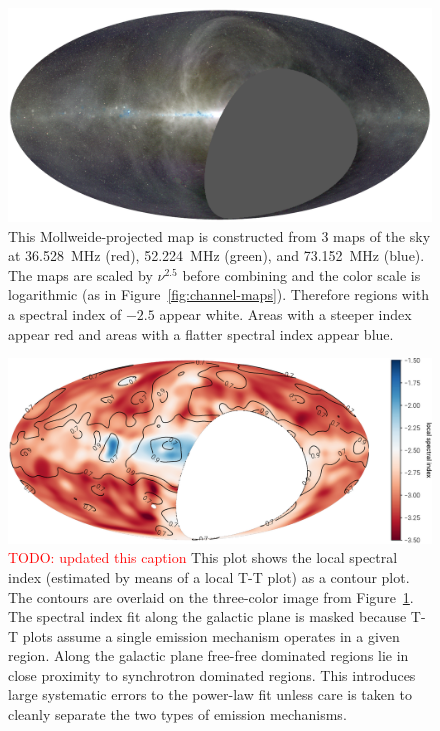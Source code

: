 \documentclass[twocolumn]{aastex61}
\newcommand{\todo}[1]{\textcolor{red}{TODO: #1}\PackageWarning{TODO:}{#1!}}
\begin{document}
\begin{figure}[t]
    \centering
    \includegraphics[width=\textwidth]{figures/spectral-index/ovro-lwa-sky-map.pdf}
    \caption{
        This Mollweide-projected map is constructed from 3 maps of the sky at 36.528~MHz (red),
        52.224~MHz (green), and 73.152~MHz (blue). The maps are scaled by $\nu^{2.5}$ before
        combining and the color scale is logarithmic (as in Figure~\ref{fig:channel-maps}).
        Therefore regions with a spectral index of $-2.5$ appear white. Areas with a steeper index
        appear red and areas with a flatter spectral index appear blue.
    }
    \label{fig:three-color}
\end{figure}

\begin{figure}[t]
    \centering
    \includegraphics[width=\textwidth]{figures/spectral-index/better-internal-spectral-index}
    \caption{
        \todo{updated this caption}
        This plot shows the local spectral index (estimated by means of a local T-T plot) as a
        contour plot. The contours are overlaid on the three-color image from
        Figure~\ref{fig:three-color}. The spectral index fit along the galactic plane is masked
        because T-T plots assume a single emission mechanism operates in a given region. Along the
        galactic plane free-free dominated regions lie in close proximity to synchrotron dominated
        regions. This introduces large systematic errors to the power-law fit unless care is taken
        to cleanly separate the two types of emission mechanisms.
    }
    \label{fig:internal-spectral-index}
\end{figure}
\end{document}

